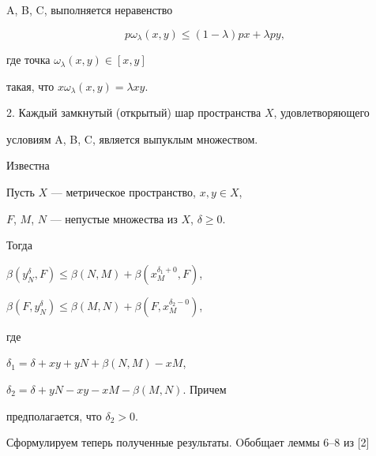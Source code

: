 A, B, C, выполняется неравенство


\begin{equation}


p\omega_{\lambda}(x,y) \leq (1 - \lambda )px + \lambda py,


\end{equation}


где точка $\omega_{\lambda}(x,y) \in [x,y]$ 


такая, что $x\omega_{\lambda}(x,y) = \lambda xy$.





2. Каждый замкнутый (открытый) шар пространства $X$, удовлетворяющего 


условиям A, B, C, является выпуклым множеством. 





Известна





\begin{lem}


Пусть $X$ --- метрическое пространство, $x, y \in X$,


$F$, $M$, $N$ --- непустые множества из $X$, $\delta \geq 0$.


Тогда


$\beta (y_{N}^{\delta},F) \leq


\beta (N,M) + \beta (x_{M}^{\delta_{1} + 0},F)$,


$\beta (F,y_{N}^{\delta}) \leq \beta (M,N) +


\beta (F,x_{M}^{\delta_{2} - 0})$,


где


$\delta_{1} = \delta + xy + yN + \beta (N,M) - xM$,


$\delta_{2} =\delta + yN - xy - xM - \beta (M,N)$. Причем


предполагается, что $\delta_{2} > 0$.


\end{lem}





Сформулируем теперь полученные результаты. Oбобщает леммы 6--8 из [2] 





